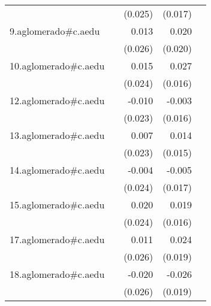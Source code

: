 {\begin{longtable}{l*{4}{D{.}{.}{-1}}}
            &                     &     (0.025)         &     (0.017)         &                     \\
\addlinespace
9.aglomerado#c.aedu&                     &       0.013         &       0.020         &                     \\
            &                     &     (0.026)         &     (0.020)         &                     \\
\addlinespace
10.aglomerado#c.aedu&                     &       0.015         &       0.027         &                     \\
            &                     &     (0.024)         &     (0.016)         &                     \\
\addlinespace
12.aglomerado#c.aedu&                     &      -0.010         &      -0.003         &                     \\
            &                     &     (0.023)         &     (0.016)         &                     \\
\addlinespace
13.aglomerado#c.aedu&                     &       0.007         &       0.014         &                     \\
            &                     &     (0.023)         &     (0.015)         &                     \\
\addlinespace
14.aglomerado#c.aedu&                     &      -0.004         &      -0.005         &                     \\
            &                     &     (0.024)         &     (0.017)         &                     \\
\addlinespace
15.aglomerado#c.aedu&                     &       0.020         &       0.019         &                     \\
            &                     &     (0.024)         &     (0.016)         &                     \\
\addlinespace
17.aglomerado#c.aedu&                     &       0.011         &       0.024         &                     \\
            &                     &     (0.026)         &     (0.019)         &                     \\
\addlinespace
18.aglomerado#c.aedu&                     &      -0.020         &      -0.026         &                     \\
            &                     &     (0.026)         &     (0.019)         &                     \\

\end{longtable}}
